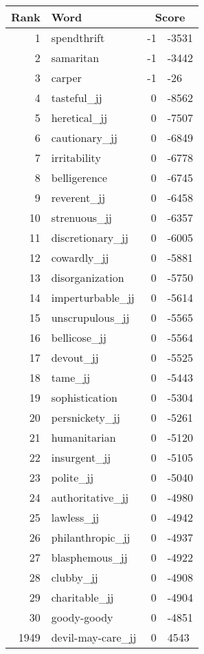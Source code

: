 \begin{longtable}[!htbp]{| rlr@{.}l |}
    \hline
    \textbf{Rank} & \textbf{Word} & \multicolumn{2}{c|}{\textbf{Score}} \\
    \hline
    \endhead
    1 & spendthrift & -1 & -3531 \\
    2 & samaritan & -1 & -3442 \\
    3 & carper & -1 & -26 \\
    4 & tasteful\_jj & 0 & -8562 \\
    5 & heretical\_jj & 0 & -7507 \\
    6 & cautionary\_jj & 0 & -6849 \\
    7 & irritability & 0 & -6778 \\
    8 & belligerence & 0 & -6745 \\
    9 & reverent\_jj & 0 & -6458 \\
    10 & strenuous\_jj & 0 & -6357 \\
    11 & discretionary\_jj & 0 & -6005 \\
    12 & cowardly\_jj & 0 & -5881 \\
    13 & disorganization & 0 & -5750 \\
    14 & imperturbable\_jj & 0 & -5614 \\
    15 & unscrupulous\_jj & 0 & -5565 \\
    16 & bellicose\_jj & 0 & -5564 \\
    17 & devout\_jj & 0 & -5525 \\
    18 & tame\_jj & 0 & -5443 \\
    19 & sophistication & 0 & -5304 \\
    20 & persnickety\_jj & 0 & -5261 \\
    21 & humanitarian & 0 & -5120 \\
    22 & insurgent\_jj & 0 & -5105 \\
    23 & polite\_jj & 0 & -5040 \\
    24 & authoritative\_jj & 0 & -4980 \\
    25 & lawless\_jj & 0 & -4942 \\
    26 & philanthropic\_jj & 0 & -4937 \\
    27 & blasphemous\_jj & 0 & -4922 \\
    28 & clubby\_jj & 0 & -4908 \\
    29 & charitable\_jj & 0 & -4904 \\
    30 & goody-goody & 0 & -4851 \\
    1949 & devil-may-care\_jj & 0 & 4543 \\

\end{longtable}
